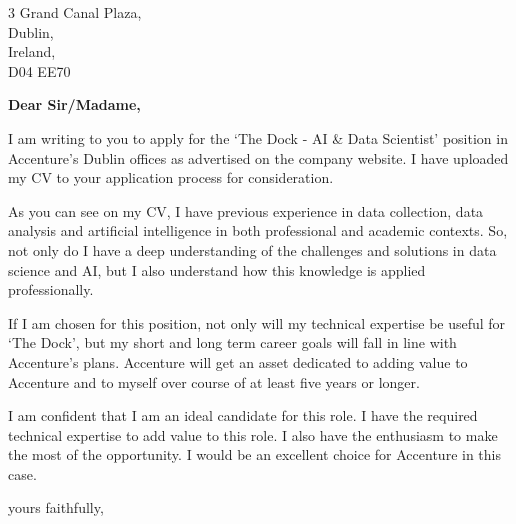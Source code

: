 \documentclass[11pt]{letter} %
\begin{document}

\begin{letter}{3 Grand Canal Plaza, \\
  Dublin, \\
  Ireland, \\
  D04 EE70} %


  \opening{\textbf{Dear Sir/Madame,}}

  I am writing to you to apply for the `The Dock - AI \& Data Scientist' position in Accenture's Dublin offices as advertised on the company website. I have uploaded my CV to your application process for consideration.

  As you can see on my CV, I have previous experience in data collection, data analysis and artificial intelligence in both professional and academic contexts. So, not only do I have a deep understanding of the challenges and solutions in data science and AI, but I also understand how this knowledge is applied professionally.

  If I am chosen for this position, not only will my technical expertise be useful for `The Dock', but my short and long term career goals will fall in line with Accenture's plans. Accenture will get an asset dedicated to adding value to Accenture and to myself over course of at least five years or longer.

  I am confident that I am an ideal candidate for this role. I have the required technical expertise to add value to this role. I also have the enthusiasm to make the most of the opportunity. I would be an excellent choice for Accenture in this case.

  \vspace{2\parskip} %
  \closing{yours faithfully,}
  \vspace{2\parskip} %




\end{letter}
\end{document}
